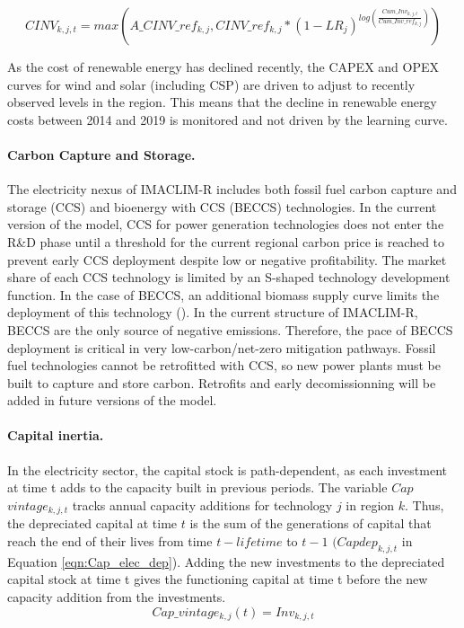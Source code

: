 \begin{dmath}
    CINV_{k,j,t} = max(A\_CINV \_ ref_{k,j}, CINV\_ref_{k,j}*(1-LR_{j})^{log(\frac{Cum\_Inv_{k,j,t}}{Cum\_Inv\_ ref_{k,j}})})
    \label{eqn:LR}
\end{dmath}

As the cost of renewable energy has declined recently, the CAPEX and OPEX curves for wind and solar (including CSP) are driven to adjust to recently observed levels in the region. This means that the decline in renewable energy costs between 2014 and 2019 is monitored and not driven by the learning curve.

\paragraph{Carbon Capture and Storage.}
The electricity nexus of IMACLIM-R includes both fossil fuel carbon capture and storage (CCS) and bioenergy with CCS (BECCS) technologies. In the current version of the model, CCS for power generation technologies does not enter the R\&D phase until a threshold for the current regional carbon price is reached to prevent early CCS deployment despite low or negative profitability. The market share of each CCS technology is limited by an S-shaped technology development function. In the case of BECCS, an additional biomass supply curve limits the deployment of this technology (\cite{Hoogwijk2009}). In the current structure of IMACLIM-R, BECCS are the only source of negative emissions. Therefore, the pace of BECCS deployment is critical in very low-carbon/net-zero mitigation pathways. Fossil fuel technologies cannot be retrofitted with CCS, so new power plants must be built to capture and store carbon. Retrofits and early decomissionning will be added in future versions of the model.


\paragraph{Capital inertia.}
In the electricity sector, the capital stock is path-dependent, as each investment at time t adds to the capacity built in previous periods. The variable $Cap$ \textunderscore $vintage_{k,j,t}$ tracks annual capacity additions for technology $j$ in region $k$. Thus, the depreciated capital at time $t$ is the sum of the generations of capital that reach the end of their lives from time $t - lifetime$ to $t - 1$ $(Cap$\textunderscore$dep_{k,j,t}$ in Equation \ref{eqn:Cap_elec_dep}). Adding the new investments to the depreciated capital stock at time t gives the functioning capital at time t before the new capacity addition from the investments.
\begin{dmath}
    Cap\_vintage_{k,j}(t) = Inv_{k,j,t}
    \label{eqn:Cap_elec_vintage}
\end{dmath}

